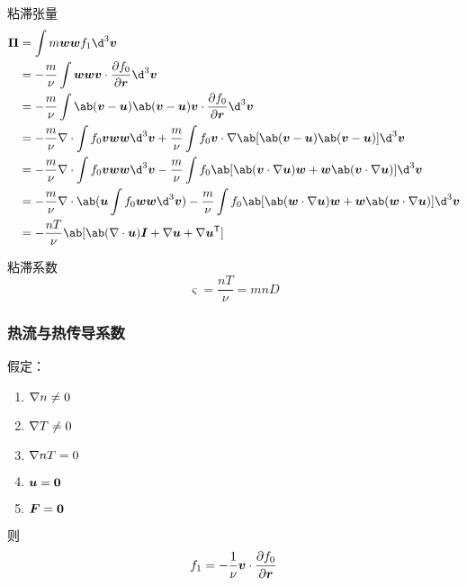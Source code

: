 粘滞张量
\begin{equation}\begin{aligned}
\vector{\Pi} &= \int m \vector{w}\vector{w} f_1 \d^3\vector{v} \\
&= - \frac{m}{\nu} \int \vector{w}\vector{w}
    \vector{v} \cdot \pdv{f_0}{\vector{r}} \d^3\vector{v} \\
&= - \frac{m}{\nu} \int \ab(\vector{v}-\vector{u})\ab(\vector{v}-\vector{u})
    \vector{v} \cdot \pdv{f_0}{\vector{r}} \d^3\vector{v} \\
&= - \frac{m}{\nu} \dive{\int f_0 \vector{v}\vector{w}\vector{w} \d^3\vector{v}}
+ \frac{m}{\nu} \int f_0 \vector{v} \cdot
    \grad{\ab[\ab(\vector{v}-\vector{u})\ab(\vector{v}-\vector{u})]}
 \d^3\vector{v} \\
&= - \frac{m}{\nu} \dive{\int f_0 \vector{v}\vector{w}\vector{w} \d^3\vector{v}}
- \frac{m}{\nu} \int f_0 \ab[
    \ab(\vector{v} \cdot \grad{\vector{u}}) \vector{w}
    + \vector{w} \ab(\vector{v} \cdot \grad{\vector{u}})
] \d^3\vector{v} \\
&= - \frac{m}{\nu} \dive{\ab(\vector{u}\int f_0 \vector{w}\vector{w} \d^3\vector{v})}
- \frac{m}{\nu} \int f_0 \ab[
    \ab(\vector{w} \cdot \grad{\vector{u}}) \vector{w}
    + \vector{w} \ab(\vector{w} \cdot \grad{\vector{u}})
] \d^3\vector{v} \\
&= - \frac{n T}{\nu} \ab[ \ab(\dive{\vector{u}}) \vector{I}
    + \grad{\vector{u}} + \grad{\vector{u}}^\T]
\end{aligned}\end{equation}

粘滞系数
\begin{equation}
\varsigma = \frac{n T}{\nu} = m n D
\end{equation}

\subsubsection{热流与热传导系数}

假定：
\begin{enumerate}
    \item $\nabla {n} \neq 0$
    \item $\nabla {T} \neq 0$
    \item $\nabla {n T} = 0$
    \item $\bm{u} = \bm{0}$
    \item $\bm{F} = \bm{0}$
\end{enumerate}
则
\begin{equation}
f_1 = - \frac{1}{\nu} \bm{v} \cdot \pdv{f_0}{\bm{r}}
\end{equation}

